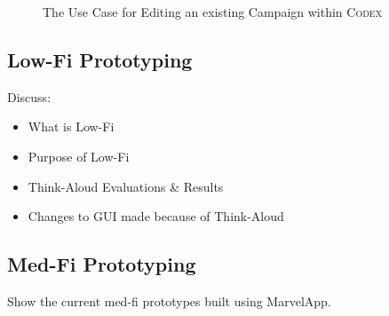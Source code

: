 \documentclass[progress]{cmpreport}
\newcommand{\Codex}{\textsc{Codex}}
\begin{document}
		\begin{figure}
			\centering
			\caption{The Use Case for Editing an existing Campaign within \Codex}\label{fig:use-case}	
		\end{figure}
	
		\subsection{Low-Fi Prototyping}
		Discuss:
		\begin{itemize}
			\item What is Low-Fi
			\item Purpose of Low-Fi
			\item Think-Aloud Evaluations \& Results
			\item Changes to GUI made because of Think-Aloud
		\end{itemize}
	
		\subsection{Med-Fi Prototyping}
		Show the current med-fi prototypes built using MarvelApp.
		
\end{document}
